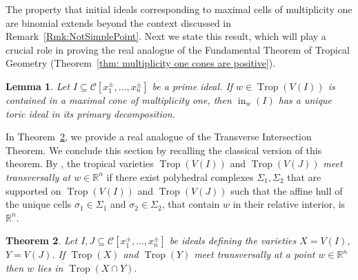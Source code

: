 \documentclass{article}
\newtheorem{theorem}{Theorem}[section]
\newtheorem{lemma}[theorem]{Lemma}
\theoremstyle{definition}
\DeclareMathOperator{\Trop}{Trop}
\newcommand{\R}{\mathbb{R}}
\newcommand{\inw}{\operatorname{in}_w}
\begin{document}
The property that initial ideals corresponding to maximal cells of multiplicity one are binomial extends beyond the context discussed in Remark~\ref{Rmk:NotSimplePoint}. Next we state this result, which will play a crucial role in proving the real analogue of the Fundamental Theorem of Tropical Geometry (Theorem~\ref{thm: multiplicity one cones are positive}).

\begin{lemma}\cite[Lemma 2.7]{Bossinger2017}
Let $I \subseteq \mathcal{C}[x_1^{\pm},\dots,x_n^{\pm}]$ be a prime ideal. If $w \in \Trop(V(I))$ is contained in a maximal cone of multiplicity one, then $\inw(I)$ has a unique toric ideal in its primary decomposition.
\end{lemma}

In Theorem~\ref{thm: weakly positive transverse intersection}, we provide a real analogue of the Transverse Intersection Theorem. We conclude this section by recalling the classical version of this theorem. By \cite[Definition 3.4.9]{maclagan2015introduction}, the tropical varieties $\Trop(V(I))$ and $ \Trop(V(J))$ \emph{meet transversally at $w \in \R^n$} if there exist polyhedral complexes
$\Sigma_1, \Sigma_2$ that are supported on $\Trop(V(I))$ and $ \Trop(V(J))$ such that the affine hull of the unique cells $\sigma_1 \in \Sigma_1$ and $\sigma_2 \in \Sigma_2$, that contain $w$ in their relative interior, is $\R^n$.

\begin{theorem}
\label{thm: weakly positive transverse intersection} \cite[Theorem 3.4.12]{maclagan2015introduction}
    Let $I, J \subseteq \mathcal{C}[x_1^\pm, \dots, x_n^\pm]$ be ideals defining the varieties $X = V(I)$, $Y = V(J)$. If $\Trop(X)$ and $ \Trop(Y)$  meet transversally at a point $w \in \R^n$ then $w $ lies in $ \Trop(X \cap Y )$.
\end{theorem}


\color{black}
\end{document}
